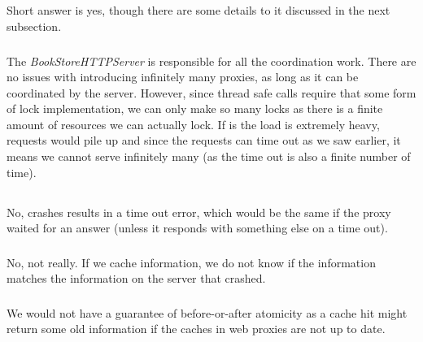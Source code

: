 \documentclass[a4paper]{article}
\begin{document}
\subsection{}
\subsubsection{}
Short answer is yes, though there are some details to it discussed in the next subsection.

\subsubsection{}
The \textit{BookStoreHTTPServer} is responsible for all the coordination work. There are no issues with introducing infinitely many proxies, as long as it can be coordinated by the server. However, since thread safe calls require that some form of lock implementation, we can only make so many locks as there is a finite amount of resources we can actually lock. If is the load is extremely heavy, requests would pile up and since the requests can time out as we saw earlier, it means we cannot serve infinitely many (as the time out is also a finite number of time).

\subsection{}
\subsubsection{}
No, crashes results in a time out error, which would be the same if the proxy waited for an answer (unless it responds with something else on a time out).

\subsubsection{}
No, not really. If we cache information, we do not know if the information matches the information on the server that crashed.

\subsubsection{}
We would not have a guarantee of before-or-after atomicity as a cache hit might return some old information if the caches in web proxies are not up to date.
\end{document}

